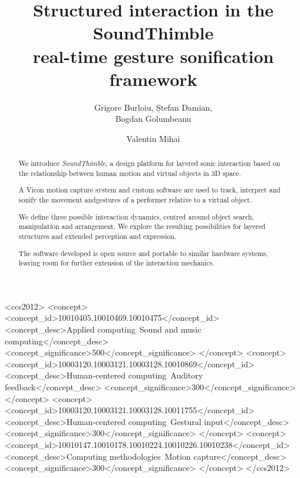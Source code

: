 \documentclass[sigchi, review]{acmart}
\begin{document}
\title{Structured interaction in the SoundThimble\\ real-time gesture sonification framework}

\author{Grigore Burloiu, Ștefan Damian,\\ Bogdan Golumbeanu}

\author{Valentin Mihai}


\begin{abstract}
We introduce \textit{SoundThimble}, a design platform for layered sonic interaction based on the relationship between human motion and virtual objects in 3D space.

A Vicon motion capture system and custom software are used to track, interpret and sonify the movement and\linebreak gestures of a performer relative to a virtual object.

We define three possible interaction dynamics, centred around object search, manipulation and arrangement. We explore the resulting possibilities for layered structures and extended perception and expression.

The software developed is open source and portable to similar hardware systems, leaving room for further extension of the interaction mechanics.
\end{abstract}

%
%
\begin{CCSXML}
 <ccs2012>
 <concept>
 <concept_id>10010405.10010469.10010475</concept_id>
 <concept_desc>Applied computing~Sound and music computing</concept_desc>
 <concept_significance>500</concept_significance>
 </concept>
 <concept>
 <concept_id>10003120.10003121.10003128.10010869</concept_id>
 <concept_desc>Human-centered computing~Auditory feedback</concept_desc>
 <concept_significance>300</concept_significance>
 </concept>
 <concept>
 <concept_id>10003120.10003121.10003128.10011755</concept_id>
 <concept_desc>Human-centered computing~Gestural input</concept_desc>
 <concept_significance>300</concept_significance>
 </concept>
 <concept>
 <concept_id>10010147.10010178.10010224.10010226.10010238</concept_id>
 <concept_desc>Computing methodologies~Motion capture</concept_desc>
 <concept_significance>300</concept_significance>
 </concept>
 </ccs2012>
\end{CCSXML}
\end{document}
